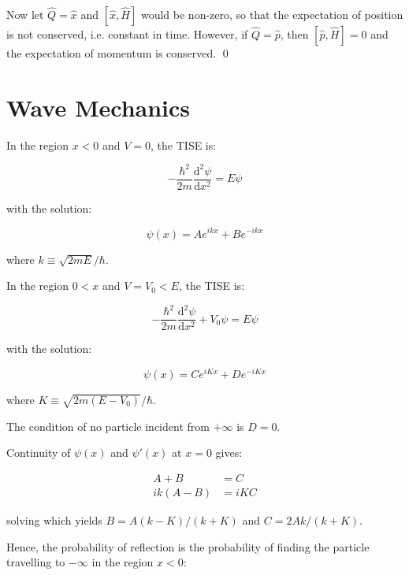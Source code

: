 \documentclass[12pt]{article}
\begin{document}
Now let $\hat{Q} = \hat{x}$ and $[\hat{x}, \hat{H}]$ would be non-zero, so that the expectation of position is not conserved, i.e. constant in time. However, if $\hat{Q} = \hat{p}$, then $[\hat{p}, \hat{H}] = 0$ and the expectation of momentum is conserved.
\qed


\pagebreak
\section*{Wave Mechanics}


In the region $x < 0$ and $V = 0$, the TISE is:

\begin{equation}
    -\frac{\hbar^{2}}{2m} \frac{\mathrm{d}^{2} \psi}{\mathrm{d}x^{2}} = E \psi
\end{equation}

with the solution:

\begin{equation}
    \psi(x) = Ae^{ikx} + Be^{-ikx}
\end{equation}

where $k \equiv \sqrt{2mE}/\hbar$.

In the region $0 < x$ and $V = V_{0} < E$, the TISE is:

\begin{equation}
    -\frac{\hbar^{2}}{2m} \frac{\mathrm{d}^{2} \psi}{\mathrm{d}x^{2}} + V_{0} \psi = E \psi
\end{equation}

with the solution:

\begin{equation}
    \psi(x) = Ce^{iKx} + De^{-iKx}
\end{equation}

where $K \equiv \sqrt{2m(E - V_{0})}/\hbar$.

The condition of no particle incident from $+\infty$ is $D = 0$.

Continuity of $\psi(x)$ and $\psi'(x)$ at $x = 0$ gives:

\begin{equation}
    \begin{split}
        A + B &= C \\
        ik(A - B) &= iKC
    \end{split}
\end{equation}

solving which yields $B = A(k - K)/(k + K)$ and $C = 2Ak/(k + K)$.

Hence, the probability of reflection is the probability of finding the particle travelling to $-\infty$ in the region $x < 0$:
\end{document}
